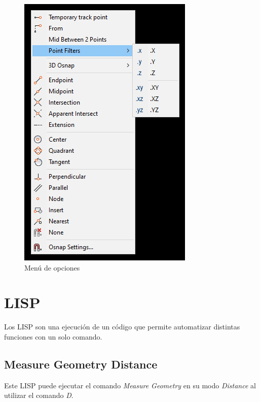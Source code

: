 \documentclass{report}
\begin{document}
\begin{figure}[H]
	\centering
	\includegraphics[width=0.85\linewidth, height=0.45\textheight,keepaspectratio]{Imagenes/autocad_rightclickmenu01}
	\caption{Menú de opciones}
	\label{fig:autocadrightclickmenu01}
\end{figure}


\chapter{LISP}

Los LISP son una ejecución de un código que permite automatizar distintas funciones con un solo comando.

\section{Measure Geometry Distance}

Este LISP puede ejecutar el comando \emph{Measure Geometry} en su modo \emph{Distance} al utilizar el comando \emph{D}. 
\end{document}
